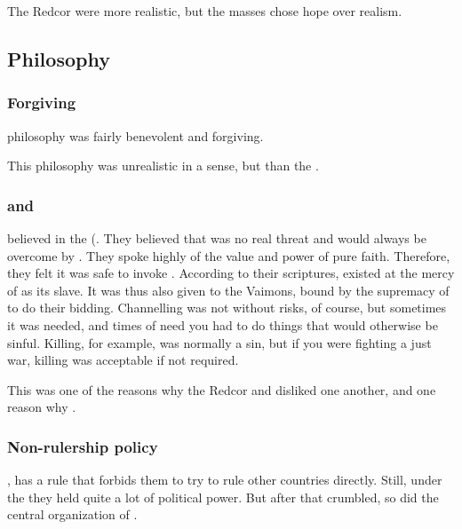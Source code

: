 The Redcor were more realistic, but the masses chose hope over realism. 









\subsection{Philosophy}






\subsubsection{Forgiving}
\Telcra philosophy was fairly benevolent and forgiving. 

This philosophy was unrealistic in a sense, but  than the . 






\subsubsection{\Iquin{} and \Itzach}
\ClanTelcra believed in the  (. 
They believed that \itzach was no real threat and would always be overcome by \iquin.
They spoke highly of the value and power of pure faith. 
Therefore, they felt it was safe to invoke \itzach. 
According to their scriptures, \itzach existed at the mercy of \iquin as its slave. 
It was thus also given to the Vaimons, bound by the supremacy of \iquin to do their bidding. 
Channelling \itzach was not without risks, of course, but sometimes it was needed, and times of need you had to do things that would otherwise be sinful. 
Killing, for example, was normally a sin, but if you were fighting a just war, killing was acceptable if not required. 

This was one of the reasons why the Redcor and \Telcras disliked one another, and one reason why .




\subsubsection{Non-rulership policy}
, \ClanTelcra{} has a rule that forbids them to try to rule other countries directly.
Still, under the  they held quite a lot of political power. 
But after that \bacconate{} crumbled, so did the central organization of \ClanTelcra. 

